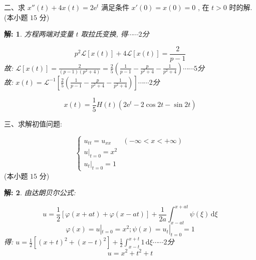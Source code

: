 \documentclass{article}
\theoremstyle{nonumberplain}
\newtheorem{solution}{\textcolor{gr}{解:}}
\newcommand{\dd}{\,\mathrm{d}}
\newcommand{\ee}{\mathrm{e}}
\newcommand{\LL}{\mathscr{L}}
\begin{document}
    \begin{flushleft}
    	二、求 $x''(t)+4x(t)=2\ee^t$ 满足条件 $x'(0)=x(0)=0$ , 在 $t>0$ 时的解. (本小题 $15$ 分)
    \end{flushleft}
    \begin{solution}
    		方程两端对变量 $t$ 取拉氏变换, 得\hfill$\cdots\cdots2$分

    		\begin{equation*}
    			p^2 \LL[x(t)]+4\LL[x(t)]=\frac{2}{p-1} \tag*{$\cdots\cdots3$分}
    		\end{equation*}
        	故: $\LL[x(t)]=\frac{2}{(p-1)(p^2+4)}=\frac{2}{5}\left( \frac{1}{p-1}-\frac{p}{p^2+4}-\frac{1}{p^2+4} \right)$\hfill$\cdots\cdots5$分\\
        	故: $x(t)=\LL^{-1}\left[ \frac{2}{5}\left( \frac{1}{p-1}-\frac{p}{p^2+4}-\frac{1}{p^2+4} \right) \right]$\hfill$\cdots\cdots2$分
        

        	\begin{equation*}
        		x(t)=\frac{1}{5}H(t)\left( 2\ee^t-2\cos 2t-\sin 2t \right) \tag*{$\cdots\cdots3$ 分}
        	\end{equation*}
        	

    \end{solution}
    
    \begin{flushleft}
    	三、求解初值问题:
    \end{flushleft}
    \begin{equation*}
    \begin{cases}
    u_{tt}=u_{xx} & (-\infty<x<+\infty)\\
    u|_{t=0}=x^2\\
    u_{t}|_{t=0}=1
    \end{cases}
    \end{equation*}
    (本小题 $15$ 分)
    \begin{solution}
    	由达朗贝尔公式:

    		\begin{equation*}
    			u=\frac{1}{2}[\varphi(x+at)+\varphi(x-at)]+\frac{1}{2a}\int_{x-at}^{x+at}\psi(\xi)\dd\xi\tag*{$\cdots\cdots5$分}
    		\end{equation*}
        	\begin{equation*}
        		\varphi(x)=u|_{t=0}=x^2;\psi(x)=u_{t}|_{t=0}=1\tag*{$\cdots\cdots3$分}
        	\end{equation*}
        	得: $u=\frac{1}{2}\left[ (x+t)^2+(x-t)^2 \right]+\frac{1}{2}\int_{x-t}^{x+t}1\dd \xi$\hfill$\cdots\cdots2$分
    \begin{equation*}
    	u=x^2+t^2+t\tag*{$\cdots\cdots5$分}
    \end{equation*}
    \end{solution}
    
\end{document}
